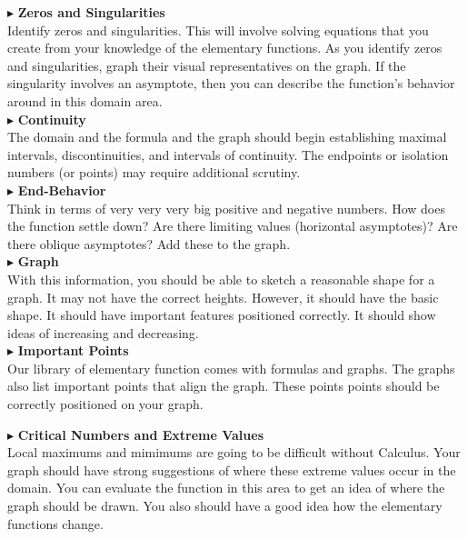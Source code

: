 \documentclass{ximera}
\begin{document}
$\blacktriangleright$ \textbf{\textcolor{red!10!blue!90!}{Zeros and Singularities}} \\
Identify zeros and singularities.  This will involve solving equations that you create from your knowledge of the elementary functions. As you identify zeros and singularities, graph their visual representatives on the graph. If the singularity involves an asymptote, then you can describe the function's behavior around in this domain area.\\



$\blacktriangleright$ \textbf{\textcolor{red!10!blue!90!}{Continuity}} \\
The domain and the formula and the graph should begin establishing maximal intervals, discontinuities, and intervals of continuity.  The endpoints or isolation numbers (or points) may require additional scrutiny.  \\


$\blacktriangleright$ \textbf{\textcolor{red!10!blue!90!}{End-Behavior}} \\
Think in terms of very very very big positive and negative numbers.  How does the function settle down?  Are there limiting values (horizontal asymptotes)?  Are there oblique asymptotes? Add these to the graph. \\


$\blacktriangleright$ \textbf{\textcolor{red!10!blue!90!}{Graph}} \\
With this information, you should be able to sketch a reasonable shape for a graph.  It may not have the correct heights. However, it should have the basic shape.  It should have important features positioned correctly. It should show ideas of increasing and decreasing. \\


$\blacktriangleright$ \textbf{\textcolor{red!10!blue!90!}{Important Points}} \\
Our library of elementary function comes with formulas and graphs.  The graphs also list important points that align the graph.  These points points should be correctly positioned on your graph.


$\blacktriangleright$ \textbf{\textcolor{red!10!blue!90!}{Critical Numbers and Extreme Values}} \\
Local maximums and mimimums are going to be difficult without Calculus.  Your graph should have strong suggestions of where these extreme values occur in the domain. You can evaluate the function in this area to get an idea of where the graph should be drawn.  You also should have a good idea how the elementary functions change.
\end{document}
